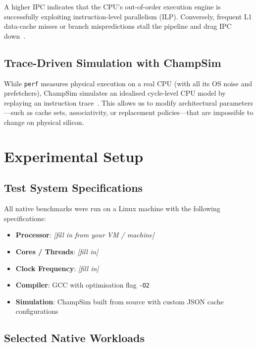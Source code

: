 \documentclass[11pt,a4paper]{article}
\begin{document}
A higher IPC indicates that the CPU's out-of-order execution engine is
successfully exploiting instruction-level parallelism (ILP).  Conversely,
frequent L1 data-cache misses or branch mispredictions stall the pipeline and
drag IPC down~\cite{hp2017}.

\subsection{Trace-Driven Simulation with ChampSim}

While \texttt{perf} measures physical execution on a real CPU (with all its OS
noise and prefetchers), ChampSim simulates an idealised cycle-level CPU model
by replaying an instruction trace~\cite{hp2017}.  This allows us to modify
architectural parameters—such as cache sets, associativity, or replacement
policies—that are impossible to change on physical silicon.

\section{Experimental Setup}

\subsection{Test System Specifications}

All native benchmarks were run on a Linux machine with the following
specifications:

\begin{itemize}[leftmargin=*]
    \item \textbf{Processor}: \textit{[fill in from your VM / machine]}
    \item \textbf{Cores / Threads}: \textit{[fill in]}
    \item \textbf{Clock Frequency}: \textit{[fill in]}
    \item \textbf{Compiler}: GCC with optimisation flag \texttt{-O2}
    \item \textbf{Simulation}: ChampSim built from source with custom JSON
          cache configurations
\end{itemize}

\subsection{Selected Native Workloads}
\end{document}
